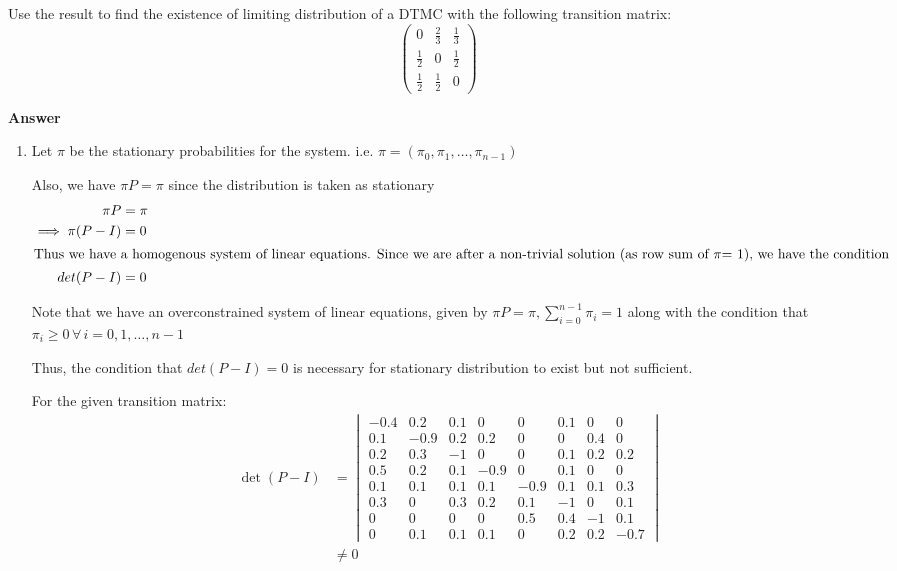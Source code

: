 \documentclass[12pt, oneside]{article}
\begin{document}
\begin{enumerate}
{\begin{enumerate}
{            Use the result to find the existence of limiting distribution of a DTMC with
            the following transition matrix:
            \[\begin{pmatrix}
                0 & \frac{2}{3} & \frac{1}{3} \\
                \frac{1}{2} & 0 & \frac{1}{2} \\
                \frac{1}{2} & \frac{1}{2} & 0
            \end{pmatrix}\]
        }
    \end{enumerate}

    \textbf{Answer}

    \begin{enumerate}
        \item {
            Let \(\pi\) be the stationary probabilities for the system. i.e.
            \(\pi = (\pi_0, \pi_1, \ldots, \pi_{n-1})\)

            Also, we have \(\pi P = \pi\) since the distribution is taken as stationary
            \begin{align*}
                \pi P &= \pi \\
                \implies \pi (P - I) &= 0 \\
                \intertext{Thus we have a homogenous system of linear equations. Since we are
                after a non-trivial solution (as row sum of \(\pi\)= 1), we have the condition}
                det(P - I) &= 0
            \end{align*}

            Note that we have an overconstrained system of linear equations, given by
            \(\pi P = \pi, \sum_{i=0}^{n-1} \pi_i = 1\) along with the condition that
            \(\pi_i \geq 0 \,\forall\, i = 0, 1, \ldots, n - 1\)

            Thus, the condition that \(det(P - I) = 0\) is necessary for stationary distribution
            to exist but not sufficient.
            
            For the given transition matrix:
            \begin{align*}
                \det(P - I) &= \begin{vmatrix}
                    -0.4 & 0.2 & 0.1 & 0 & 0 & 0.1 & 0 & 0 \\
                    0.1	& -0.9 & 0.2 & 0.2 & 0 & 0 & 0.4 & 0 \\
                    0.2 & 0.3 & -1 & 0 & 0 & 0.1 & 0.2 & 0.2 \\
                    0.5 & 0.2 & 0.1 & -0.9 & 0 & 0.1 & 0 & 0 \\
                    0.1 & 0.1 & 0.1 & 0.1 & -0.9 & 0.1 & 0.1 & 0.3 \\
                    0.3 & 0 & 0.3 & 0.2 & 0.1 & -1 & 0 & 0.1 \\
                    0 & 0 & 0 & 0 & 0.5 & 0.4 & -1 & 0.1 \\
                    0 & 0.1 & 0.1 & 0.1 & 0 & 0.2 & 0.2 & -0.7
                \end{vmatrix} \\
                        &\neq 0
            \end{align*}

}
\end{enumerate}}
\end{enumerate}
\end{document}
